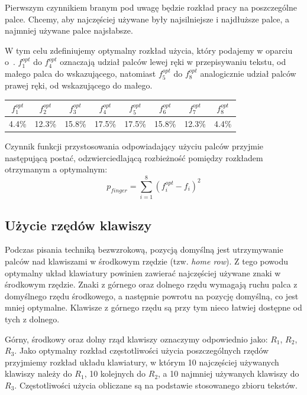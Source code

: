 \documentclass{xmgr}
\begin{document}
Pierwszym czynnikiem branym pod uwagę będzie rozkład pracy na poszczególne palce. Chcemy, aby najczęściej używane były najsilniejsze i najdłuższe palce, a najmniej używane palce najsłabsze.

W tym celu zdefiniujemy optymalny rozkład użycia, który podajemy w oparciu o~\cite{Eggers2003672}. $f^{opt}_1$ do $f^{opt}_4$ oznaczają udział palców lewej ręki w przepisywaniu tekstu, od małego palca do wskazującego, natomiast $f^{opt}_5$ do $f^{opt}_8$ analogicznie udział palców prawej ręki, od wskazującego do małego.\newline

\begin{tabular}{ c | c | c | c | c | c | c | c }
  $f^{opt}_1$ & $f^{opt}_2$ & $f^{opt}_3$ & $f^{opt}_4$ & $f^{opt}_5$ & $f^{opt}_6$ & $f^{opt}_7$ & $f^{opt}_8$ \\
  \hline
  4.4\% & 12.3\% & 15.8\% & 17.5\% & 17.5\% & 15.8\% & 12.3\% & 4.4\% \\
\end{tabular}\newline

Czynnik funkcji przystosowania odpowiadający użyciu palców przyjmie następującą postać, odzwierciedlającą rozbieżność pomiędzy rozkładem otrzymanym a optymalnym:
$$ p_{finger} = \sum\limits_{i = 1}^{8} (f_i^{opt} - f_i)^2 $$


\subsection{Użycie rzędów klawiszy}

Podczas pisania techniką bezwzrokową, pozycją domyślną jest utrzymywanie palców nad klawiszami w środkowym rzędzie (tzw. \emph{home row}). Z tego powodu optymalny układ klawiatury powinien zawierać najczęściej używane znaki w środkowym rzędzie. Znaki z górnego oraz dolnego rzędu wymagają ruchu palca z domyślnego rzędu środkowego, a następnie powrotu na pozycję domyślną, co jest mniej optymalne. Klawisze z górnego rzędu są przy tym nieco łatwiej dostępne od tych z dolnego.

Górny, środkowy oraz dolny rząd klawiszy oznaczymy odpowiednio jako: $R_1$, $R_2$, $R_3$. Jako optymalny rozkład częstotliwości użycia poszczególnych rzędów przyjmiemy rozkład układu klawiatury, w którym 10 najczęściej używanych klawiszy należy do $R_1$, 10 kolejnych do $R_2$, a 10 najmniej używanych klawiszy do $R_3$. Częstotliwości użycia obliczane są na podstawie stosowanego zbioru tekstów.
\end{document}
